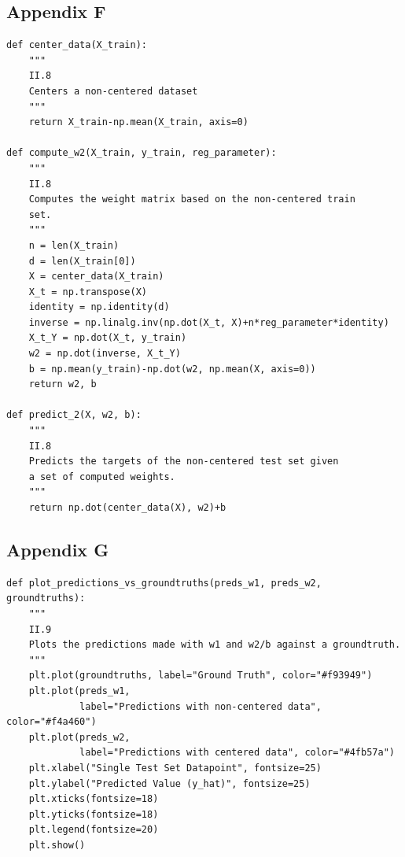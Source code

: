 \documentclass{homework}
\begin{document}
\subsection*{Appendix F}
\lstset{language=Python}
\lstset{frame=lines}
\lstset{basicstyle=\footnotesize}
\begin{lstlisting}
def center_data(X_train):
    """
    II.8
    Centers a non-centered dataset
    """
    return X_train-np.mean(X_train, axis=0)

def compute_w2(X_train, y_train, reg_parameter):
    """
    II.8
    Computes the weight matrix based on the non-centered train
    set.
    """
    n = len(X_train)
    d = len(X_train[0])
    X = center_data(X_train)
    X_t = np.transpose(X)
    identity = np.identity(d)
    inverse = np.linalg.inv(np.dot(X_t, X)+n*reg_parameter*identity)
    X_t_Y = np.dot(X_t, y_train)
    w2 = np.dot(inverse, X_t_Y)
    b = np.mean(y_train)-np.dot(w2, np.mean(X, axis=0))
    return w2, b

def predict_2(X, w2, b):
    """
    II.8
    Predicts the targets of the non-centered test set given 
    a set of computed weights.
    """
    return np.dot(center_data(X), w2)+b
\end{lstlisting}

\subsection*{Appendix G}
\lstset{language=Python}
\lstset{frame=lines}
\lstset{basicstyle=\footnotesize}
\begin{lstlisting}
def plot_predictions_vs_groundtruths(preds_w1, preds_w2, groundtruths):
    """
    II.9
    Plots the predictions made with w1 and w2/b against a groundtruth.
    """
    plt.plot(groundtruths, label="Ground Truth", color="#f93949")
    plt.plot(preds_w1, 
             label="Predictions with non-centered data", color="#f4a460")
    plt.plot(preds_w2, 
             label="Predictions with centered data", color="#4fb57a")
    plt.xlabel("Single Test Set Datapoint", fontsize=25)
    plt.ylabel("Predicted Value (y_hat)", fontsize=25)
    plt.xticks(fontsize=18)
    plt.yticks(fontsize=18)
    plt.legend(fontsize=20)
    plt.show()
\end{lstlisting}
\end{document}
